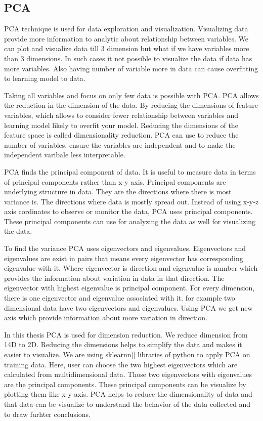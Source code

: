 \subsection{PCA}
PCA technique is used for data exploration and visualization. Visualizing data provide more information to analytic about relationship between variables. We can plot and visualize data till 3 dimension but what if we have variables more than 3 dimensions. In such cases it not possible to visualize the data if data has more variables. Also having number of variable more in data can cause overfitting to learning model to data.

\par Taking all variables and focus on only few data is possible with PCA. PCA allows the reduction in the dimension of the data. By reducing the dimensions of feature variables, which allows to consider fewer relationship between variables and learning model likely to overfit your model. Reducing the dimensions of the feature space is called dimensionality reduction. PCA can use to reduce the number of variables, ensure the variables are independent and to make the independent varibale less interpretable. 

\par PCA finds the principal component of data. It is useful to measure data in terms of principal components rather than x-y axis. Principal components are underlying structure in data. They are the directions where there is most variance is. The directions where data is mostly spread out. Instead of using x-y-z axis cordinates to observe or monitor the data, PCA uses principal components. These principal components can use for analyzing the data as well for visualizing the data. 

\par To find the variance PCA uses eigenvectors and eigenvalues. Eigenvectors and eigenvalues are exist in pairs that means every eigenvector has corresponding eigenvalue with it. Where eigenvector is direction and eigenvalue is number which provides the information about variation in data in that direction. The eigenvector with highest eigenvalue is principal component. For every dimension, there is one eigenvector and eigenvalue associated with it. for example two dimensional data have two eigenvectors and eigenvalues. Using PCA we get new axis which provide information about more variation in direction. 

\par In this thesis PCA is used for dimension reduction. We reduce dimension from 14D to 2D. Reducing the dimensions helps to simplify the data and makes it easier to visualize. We are using sklearnn[] libraries of python to apply PCA on training data. Here, user can choose the two highest eigenvectors which are calculated from multidimensional data. Those two eigenvectors with eigenvalues are the principal components. These principal components can be visualize by plotting them like x-y axis. PCA  helps to reduce the dimensionality of data and that data can be visualize to understand the behavior of the data collected and to draw furhter conclusions. 

